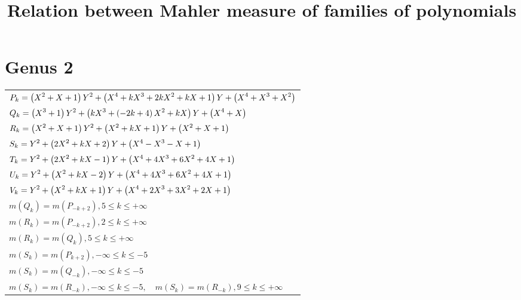 \documentclass{amsart}
\begin{document}
\title{Relation between Mahler measure of families of polynomials}



\maketitle
\fontsize{10}{10}\selectfont

\section{Genus 2}
\fontsize{2.5}{2.5}\selectfont
\hspace*{1cm}
\begin{longtable}{|l|}
\hline
\(\displaystyle P_k= \left(X^2
 + X
 + 1\right) \*Y^2
 + \left(X^4
 + k\*X^3
 + 2\*k\*X^2
 + k\*X
 + 1\right) \*Y
 + \left(X^4
 + X^3
 + X^2\right) \)\\
\(\displaystyle Q_k= \left(X^3
 + 1\right) \*Y^2
 + \left(k\*X^3
 + \left(-2\*k
 + 4\right) \*X^2
 + k\*X\right) \*Y
 + \left(X^4
 + X\right) \)\\
\(\displaystyle R_k= \left(X^2
 + X
 + 1\right) \*Y^2
 + \left(X^2
 + k\*X
 + 1\right) \*Y
 + \left(X^2
 + X
 + 1\right) \)\\
\(\displaystyle S_k=Y^2
 + \left(2\*X^2
 + k\*X
 + 2\right) \*Y
 + \left(X^4
 - X^3
 - X
 + 1\right) \)\\
\(\displaystyle T_k=Y^2
 + \left(2\*X^2
 + k\*X
 - 1\right) \*Y
 + \left(X^4
 + 4\*X^3
 + 6\*X^2
 + 4\*X
 + 1\right) \)\\
\(\displaystyle U_k=Y^2
 + \left(X^2
 + k\*X
 - 2\right) \*Y
 + \left(X^4
 + 4\*X^3
 + 6\*X^2
 + 4\*X
 + 1\right) \)\\
\(\displaystyle V_k=Y^2
 + \left(X^2
 + k\*X
 + 1\right) \*Y
 + \left(X^4
 + 2\*X^3
 + 3\*X^2
 + 2\*X
 + 1\right) \)\\
\(\displaystyle m(Q_k) = m(P_{-k
 + 2}),5 \leqslant k \leqslant +\infty\)\\
\(\displaystyle m(R_k) = m(P_{-k
 + 2}),2 \leqslant k \leqslant +\infty\)\\
\(\displaystyle m(R_k) = m(Q_{k}),5 \leqslant k \leqslant +\infty\)\\
\(\displaystyle m(S_k) = m(P_{k
 + 2}),-\infty \leqslant k \leqslant -5\)\\
\(\displaystyle m(S_k) = m(Q_{-k}),-\infty \leqslant k \leqslant -5\)\\
\(\displaystyle m(S_k) = m(R_{-k}),-\infty \leqslant k \leqslant -5,\quad m(S_k) = m(R_{-k}),9 \leqslant k \leqslant +\infty\)\\

\end{longtable}
\end{document}
